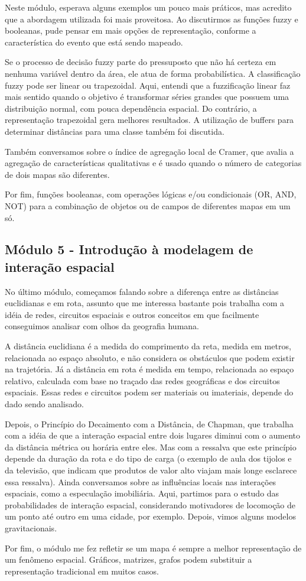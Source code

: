 Neste módulo, esperava alguns exemplos um pouco mais práticos, mas acredito que a abordagem utilizada foi mais proveitosa. Ao discutirmos as funções fuzzy e booleanas, pude pensar em mais opções de representação, conforme a característica do evento que está sendo mapeado.

Se o processo de decisão fuzzy parte do pressuposto que não há certeza em nenhuma variável dentro da área, ele atua de forma probabilística. A classificação fuzzy pode ser linear ou trapezoidal. Aqui, entendi que a fuzzificação linear faz mais sentido quando o objetivo é transformar séries grandes que possuem uma distribuição normal, com pouca dependência espacial. Do contrário, a representação trapezoidal gera melhores resultados. A utilização de buffers para determinar distâncias para uma classe também foi discutida.

Também conversamos sobre o índice de agregação local de Cramer, que avalia a agregação de características qualitativas e é usado quando o número de categorias de dois mapas são diferentes.

Por fim, funções booleanas, com operações lógicas e/ou condicionais (OR, AND, NOT) para a combinação de objetos ou de campos de diferentes mapas em um só.

\subsection{Módulo 5 - Introdução à modelagem de interação espacial}

No último módulo, começamos falando sobre a diferença entre as distâncias euclidianas e em rota, assunto que me interessa bastante pois trabalha com a idéia de redes, circuitos espaciais e outros conceitos em que facilmente conseguimos analisar com olhos da geografia humana.

A distância euclidiana é a medida do comprimento da reta, medida em metros, relacionada ao espaço absoluto, e não considera os obstáculos que podem existir na trajetória. Já a distância em rota é medida em tempo, relacionada ao espaço relativo, calculada com base no traçado das redes geográficas e dos circuitos espaciais. Essas redes e circuitos podem ser materiais ou imateriais, depende do dado sendo analisado.

Depois, o Princípio do Decaimento com a Distância, de Chapman, que trabalha com a idéia de que a interação espacial entre dois lugares diminui com o aumento da distância métrica ou horária entre eles. Mas com a ressalva que este princípio depende da duração da rota e do tipo de carga (o exemplo de aula dos tijolos e da televisão, que indicam que produtos de valor alto viajam mais longe esclarece essa ressalva). Ainda conversamos sobre as influências locais nas interações espaciais, como a especulação imobiliária. Aqui, partimos para o estudo das probabilidades de interação espacial, considerando motivadores de locomoção de um ponto até outro em uma cidade, por exemplo. Depois, vimos alguns modelos gravitacionais.

Por fim, o módulo me fez refletir se um mapa é sempre a melhor representação de um fenômeno espacial. Gráficos, matrizes, grafos podem substituir a representação tradicional em muitos casos.



